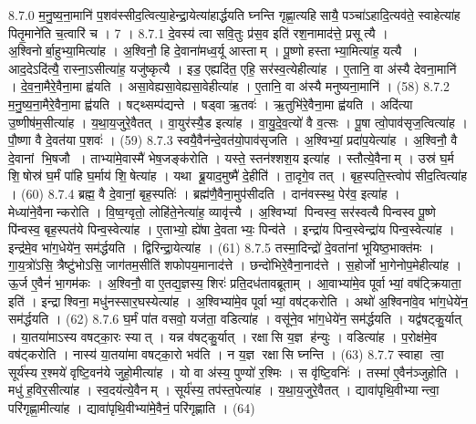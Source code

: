 8.7.0
म॒नु॒ष्य॒ना॒मानि॑ प॒शव॑स्सीद॒त्वित्या॒हेन्द्रा॒येत्या॑हार्द्धयति घ्नन्ति गृह्णा॒त्यहिसायै॒ पञ्चा॑ऽहादि॒त्यव॑ते॒ स्वाहेत्या॑ह पितृ॒माने॑ति च॒त्वारि॑ च । 7 ।
8.7.1
दे॒वस्य॑ त्वा सवि॒तुः प्र॑स॒व इति॑ रश॒नामाद॑त्ते॒ प्रसूत्यै । अ॒श्विनोर्बा॒हुभ्या॒मित्या॑ह । अ॒श्विनौ॒ हि दे॒वाना॑मध्व॒र्यू आस्ताम् । पू॒ष्णो हस्ताभ्या॒मित्या॑ह॒ यत्यै । आद॒देऽदि॑त्यै॒ रास्ना॒ऽसीत्या॑ह॒ यजु॑ष्कृत्यै । इड॒ एह्यदि॑त॒ एहि॒ सर॑स्व॒त्येहीत्या॑ह । ए॒तानि॒ वा अ॑स्यै देवना॒मानि॑ । दे॒व॒ना॒मैरे॒वैना॒मा ह्व॑यति । असा॒वेह्यसा॒वेह्यसा॒वेहीत्या॑ह । ए॒तानि॒ वा अ॑स्यै मनुष्यना॒मानि॑ । (58)
8.7.2
म॒नु॒ष्य॒ना॒मैरे॒वैना॒मा ह्व॑यति । षट्थ्सम्प॑द्यन्ते । षड्वा ऋ॒तवः॑ । ऋ॒तुभि॑रे॒वैना॒मा ह्व॑यति । अदि॑त्या उ॒ष्णीष॑म॒सीत्या॑ह । य॒था॒य॒जुरे॒वैतत् । वा॒युर॑स्यै॒ड इत्या॑ह । वा॒यु॒दे॒व॒त्यो॑ वै व॒त्सः । पू॒षा त्वो॒पाव॑सृज॒त्वित्या॑ह । पौ॒ष्णा वै दे॒वत॑या प॒शवः॑ । (59)
8.7.3
स्वयै॒वैन॑न्दे॒वत॑यो॒पाव॑सृजति । अ॒श्विभ्यां॒ प्रदा॑प॒येत्या॑ह । अ॒श्विनौ॒ वै दे॒वानां भि॒षजौ । ताभ्या॑मे॒वास्मै॑ भेष॒जङ्क॑रोति । यस्ते॒ स्तन॑श्शश॒य इत्या॑ह । स्तौत्ये॒वैनाम् । उस्र॑ घ॒र्म शि॒षोस्र॑ घ॒र्मं पा॑हि घ॒र्माय॑ शि॒षेत्या॑ह । यथा ब्रू॒याद॒मुष्मै॑ दे॒हीति॑ । ता॒दृगे॒व तत् । बृह॒स्पति॒स्त्वोप॑ सीद॒त्वित्या॑ह । (60)
8.7.4
ब्रह्म॒ वै दे॒वानां॒ बृह॒स्पतिः॑ । ब्रह्म॑णै॒वैना॒मुप॑सीदति । दान॑वस्स्थ॒ पेर॑व॒ इत्या॑ह । मेध्या॑ने॒वैनान्करोति । वि॒ष्व॒ग्वृतो॒ लोहि॑ते॒नेत्या॑ह॒ व्यावृ॑त्त्यै । अ॒श्विभ्यां पिन्वस्व॒ सर॑स्वत्यै पिन्वस्व पू॒ष्णे पि॑न्वस्व॒ बृह॒स्पत॑ये पिन्व॒स्वेत्या॑ह । ए॒ताभ्यो॒ ह्ये॑षा दे॒वताभ्यः॒ पिन्व॑ते । इन्द्रा॑य पिन्व॒स्वेन्द्रा॑य पिन्व॒स्वेत्या॑ह । इन्द्र॑मे॒व भा॑ग॒धेये॑न॒ सम॑र्द्धयति । द्विरिन्द्रा॒येत्या॑ह । (61)
8.7.5
तस्मा॒दिन्द्रो॑ दे॒वता॑नां भूयिष्ठ॒भाक्त॑मः । गा॒य॒त्रो॑ऽसि॒ त्रैष्टु॑भोऽसि॒ जाग॑तम॒सीति॑ शफोपय॒मानाद॑त्ते । छन्दो॑भिरे॒वैना॒नाद॑त्ते । स॒होर्जो भा॒गेनोप॒मेहीत्या॑ह । ऊ॒र्ज ए॒वैनं॑ भा॒गम॑कः । अ॒श्विनौ॒ वा ए॒तद्य॒ज्ञस्य॒ शिरः॑ प्रति॒दध॑तावब्रूताम् । आ॒वाभ्या॑मे॒व पूर्वाभ्यां॒ वष॑ट्क्रियाता॒ इति॑ । इन्द्राश्विना॒ मधु॑नस्सार॒घस्येत्या॑ह । अ॒श्विभ्या॑मे॒व पूर्वाभ्यां॒ वष॑ट्करोति । अथो॑ अ॒श्विना॑वे॒व भा॑ग॒धेये॑न॒ सम॑र्द्धयति । (62)
8.7.6
घ॒र्मं पा॑त वसवो॒ यज॑ता॒ वडित्या॑ह । वसू॑ने॒व भा॑ग॒धेये॑न॒ सम॑र्द्धयति । यद्व॑षट्कु॒र्यात् । या॒तया॑माऽस्य वषट्का॒रः स्यात् । यन्न व॑षट्कु॒र्यात् । रक्षासि य॒ज्ञ ह॑न्युः । वडित्या॑ह । प॒रोक्ष॑मे॒व वष॑ट्करोति । नास्य॑ या॒तया॑मा वषट्का॒रो भव॑ति । न य॒ज्ञ रक्षासि घ्नन्ति । (63)
8.7.7
स्वाहा त्वा॒ सूर्य॑स्य र॒श्मये॑ वृष्टि॒वन॑ये जुहो॒मीत्या॑ह । यो वा अ॑स्य॒ पुण्यो॑ र॒श्मिः । स वृ॑ष्टि॒वनिः॑ । तस्मा॑ ए॒वैन॑ञ्जुहोति । मधु॑ ह॒विर॒सीत्या॑ह । स्व॒दय॑त्ये॒वैनम् । सूर्य॑स्य॒ तप॑स्त॒पेत्या॑ह । य॒था॒य॒जुरे॒वैतत् । द्यावा॑पृथि॒वीभ्यान्त्वा॒ परि॑गृह्णा॒मीत्या॑ह । द्यावा॑पृथि॒वीभ्या॑मे॒वैनं॒ परि॑गृह्णाति । (64)
